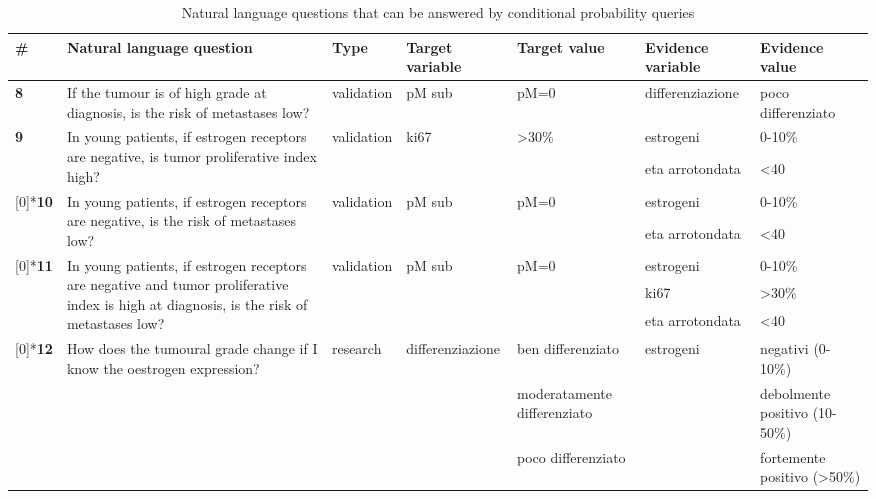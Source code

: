 \begin{sidewaystable*}[h]
  \centering
  \captionsetup{name=Annex}
  \caption{Natural language questions that can be answered by conditional probability queries}
    \begin{tabularx}{\textwidth}{lXllllX}
	    \toprule
	    \textbf{\#} & Natural language question & Type  & Target variable & Target value & Evidence variable & Evidence value \\
		\midrule      
		\textbf{8} & If the tumour is of high grade at diagnosis, is the risk of metastases low? & validation & pM sub & pM=0  & differenziazione & poco differenziato \\
		\multirow{2}[0]{*}{\textbf{9}} & \multirow{2}[0]{4cm}{In young patients, if estrogen receptors are negative, is tumor proliferative index high?} & \multirow{2}[0]{*}{validation} & \multirow{2}[0]{*}{ki67} & \multirow{2}[0]{*}{>30\%} & estrogeni & 0-10\% \\
		      &       &       &       &       & eta arrotondata & <40 \\	  
	    \addlinespace[6ex]
		\multirow{2}[0]{*}{\textbf{10}} & \multirow{2}[0]{4cm}{In young patients, if estrogen receptors are negative, is the risk of metastases low?} & \multirow{2}[0]{*}{validation} & \multirow{2}[0]{*}{pM sub} & \multirow{2}[0]{4cm}{pM=0} & estrogeni & 0-10\% \\
		      &       &       &       &       & eta arrotondata & <40 \\
      \addlinespace[6ex]
		\multirow{3}[0]{*}{\textbf{11}} & \multirow{3}[0]{4cm}{In young patients, if estrogen receptors are negative and tumor proliferative index is  high at diagnosis, is the risk of metastases low?} & \multirow{3}[0]{*}{validation} & \multirow{3}[0]{*}{pM sub} & \multirow{3}[0]{*}{pM=0} & estrogeni & 0-10\% \\
		      &       &       &       &       & ki67  & >30\% \\
		      &       &       &       &       & eta arrotondata & <40 \\
      \addlinespace[9ex]
	      \multirow{3}[0]{*}{\textbf{12}} & \multirow{3}[0]{4cm}{How does the tumoural grade change if I know the oestrogen expression?} & \multirow{3}[0]{*}{research} & \multirow{3}[0]{*}{differenziazione} &  ben differenziato & \multirow{3}[0]{*}{estrogeni} & negativi (0-10\%) \\
		      &       &       &       &  moderatamente differenziato &       & debolmente positivo (10-50\%) \\
		      &       &       &       &  poco differenziato &       & fortemente positivo (>50\%) \\

\end{tabularx}
\end{sidewaystable*}
